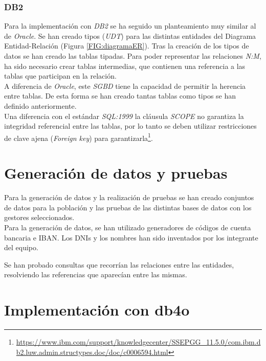 \documentclass{article}
\begin{document}
\subsubsection{DB2}

Para la implementación con \emph{DB2} se ha seguido un planteamiento muy similar al de \emph{Oracle}. Se han creado tipos (\emph{UDT}) para las distintas entidades del Diagrama Entidad-Relación (Figura \ref{FIG:diagramaER}). Tras la creación de los tipos de datos se han creado las tablas tipadas. Para poder representar las relaciones \emph{N:M}, ha sido necesario crear tablas intermedias, que contienen una referencia a las tablas que participan en la relación.\\
A diferencia de \emph{Oracle}, este \emph{SGBD} tiene la capacidad de permitir la herencia entre tablas. De esta forma se han creado tantas tablas como tipos se han definido anteriormente.\\
Una diferencia con 
el estándar \emph{SQL:1999} la cláusula \emph{SCOPE} no garantiza la integridad referencial entre las tablas, por lo tanto se deben utilizar restricciones de clave ajena (\emph{Foreign key}) para garantizarla\footnote{\url{https://www.ibm.com/support/knowledgecenter/SSEPGG_11.5.0/com.ibm.db2.luw.admin.structypes.doc/doc/c0006594.html}}.
\\

\section{Generación de datos y pruebas}

Para la generación de datos y la realización de pruebas se han creado conjuntos de datos para la población y las pruebas de las distintas bases de datos con los gestores seleccionados.\\

Para la generación de datos, se han utilizado generadores de códigos de cuenta bancaria e IBAN. Los DNIs y los nombres han sido inventados por los integrante del equipo.

Se han probado consultas que recorrían las relaciones entre las entidades, resolviendo las referencias que aparecían entre las mismas.

\newpage

\section{Implementación con db4o}
\end{document}
